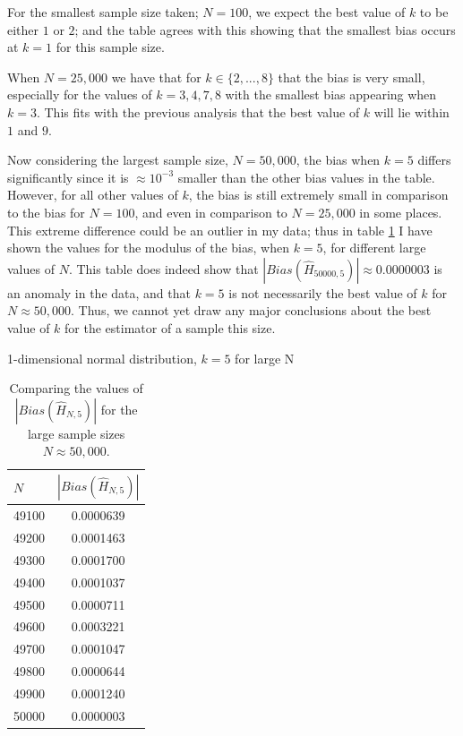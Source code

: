 \documentclass[12pt]{report}
\begin{document}
For the smallest sample size taken; $N=100$, we expect the best value of $k$ to be either $1$ or $2$; and the table agrees with this showing that the smallest bias occurs at $k=1$ for this sample size. 

When $N=25,000$ we have that for $k \in \{2,..., 8\}$ that the bias is very small, especially for the values of $k=3, 4, 7, 8$ with the smallest bias appearing when $k=3$. This fits with the previous analysis that the best value of $k$ will lie within $1$ and $9$.

Now considering the largest sample size, $N=50,000$, the bias when $k=5$ differs significantly since it is $\approx 10^{-3}$ smaller than the other bias values in the table. However, for all other values of $k$, the bias is still extremely small in comparison to the bias for $N=100$, and even in comparison to $N=25,000$ in some places. This extreme difference could be an outlier in my data; thus in table \ref{normal_k5_table} I have shown the values for the modulus of the bias, when $k=5$, for different large values of $N$. This table does indeed show that $|Bias(\hat{H}_{50000, 5})| \approx 0.0000003$ is an anomaly in the data, and that $k=5$ is not necessarily the best value of $k$ for $N \approx 50,000$. Thus, we cannot yet draw any major conclusions about the best value of $k$ for the estimator of a sample this size.

\begin{table}
\caption{1-dimensional normal distribution, $k=5$ for large N} \label{normal_k5_table}
\begin{center}
\begin{tabular}{| l | c |} 
\toprule
$N$ &  $|Bias(\hat{H}_{N, 5})|$ \\
\midrule[1pt]
49100    & 0.0000639   \\
49200    & 0.0001463   \\
49300    & 0.0001700   \\
49400    & 0.0001037   \\
49500    & 0.0000711   \\
49600    & 0.0003221   \\
49700    & 0.0001047   \\
49800    & 0.0000644   \\
49900    & 0.0001240   \\
50000    & 0.0000003   \\
\hline
\end{tabular}
\\[10pt]
\caption*{Comparing the values of $|Bias(\hat{H}_{N, 5})|$ for the large sample sizes $N \approx 50,000$.}
\end{center}
\end{table}
\end{document}
